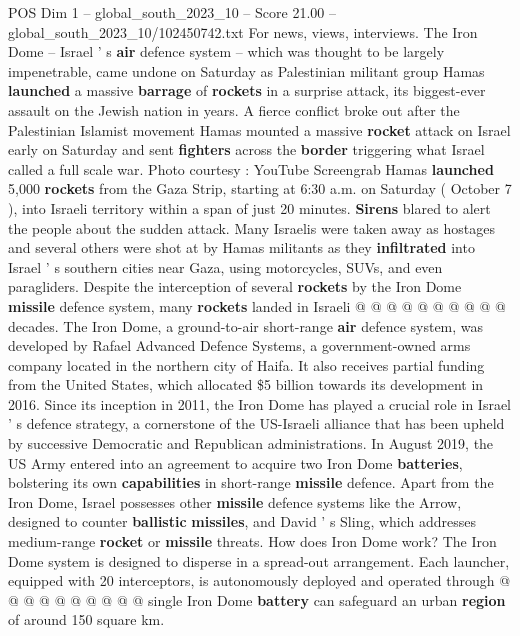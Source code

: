 \begin{textsample}{POS Dim 1 – global\_south\_2023\_10 – Score 21.00 – global\_south\_2023\_10/102450742.txt}  \label{ex:f1_pos_055}
For news, views, interviews.
The Iron Dome -- Israel ' s \textbf{air} defence system -- which was thought to be largely impenetrable, came undone on Saturday as Palestinian militant group Hamas \textbf{launched} a massive \textbf{barrage} of \textbf{rockets} in a surprise attack, its biggest-ever assault on the Jewish nation in years.
A fierce conflict broke out after the Palestinian Islamist movement Hamas mounted a massive \textbf{rocket} attack on Israel early on Saturday and sent \textbf{fighters} across the \textbf{border} triggering what Israel called a full scale war.
Photo courtesy : YouTube Screengrab Hamas \textbf{launched} 5,000 \textbf{rockets} from the Gaza Strip, starting at 6:30 a.m. on Saturday ( October 7 ), into Israeli territory within a span of just 20 minutes. \textbf{Sirens} blared to alert the people about the sudden attack.
Many Israelis were taken away as hostages and several others were shot at by Hamas militants as they \textbf{infiltrated} into Israel ' s southern cities near Gaza, using motorcycles, SUVs, and even paragliders.
Despite the interception of several \textbf{rockets} by the Iron Dome \textbf{missile} defence system, many \textbf{rockets} landed in Israeli @ @ @ @ @ @ @ @ @ @ decades.
The Iron Dome, a ground-to-air short-range \textbf{air} defence system, was developed by Rafael Advanced Defence Systems, a government-owned arms company located in the northern city of Haifa.
It also receives partial funding from the United States, which allocated \$5 billion towards its development in 2016.
Since its inception in 2011, the Iron Dome has played a crucial role in Israel ' s defence strategy, a cornerstone of the US-Israeli alliance that has been upheld by successive Democratic and Republican administrations.
In August 2019, the US Army entered into an agreement to acquire two Iron Dome \textbf{batteries}, bolstering its own \textbf{capabilities} in short-range \textbf{missile} defence.
Apart from the Iron Dome, Israel possesses other \textbf{missile} defence systems like the Arrow, designed to counter \textbf{ballistic} \textbf{missiles}, and David ' s Sling, which addresses medium-range \textbf{rocket} or \textbf{missile} threats.
How does Iron Dome work?
The Iron Dome system is designed to disperse in a spread-out arrangement.
Each launcher, equipped with 20 interceptors, is autonomously deployed and operated through @ @ @ @ @ @ @ @ @ @ single Iron Dome \textbf{battery} can safeguard an urban \textbf{region} of around 150 square km.

\end{textsample}
